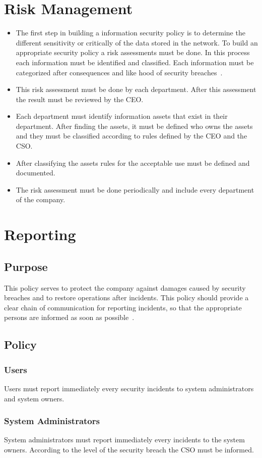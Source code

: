 \chapter{Risk Management}
\begin{itemize}
\item The first step in building a information security policy is to determine the different sensitivity or critically of the data stored in the network. To build an appropriate security policy a risk assessments must be done. In this process each information must be identified and classified.  Each information must be categorized after consequences and like hood of security breaches~\cite{Host}. 
\item This risk assessment must be done by each department.  After this assessment the result must be reviewed by the CEO. 
\item Each department must identify information assets that exist in their department.  After finding the assets, it must be defined who owns the assets and they must be classified according to rules defined by the CEO and the CSO.
\item After classifying the assets rules for  the acceptable use must be defined and documented. 
\item The risk assessment must be done periodically and include every department of the company. 
\end{itemize}
\chapter{Reporting}
\section{Purpose}
This policy serves to protect the company against damages caused  by security breaches and to restore operations after incidents. This policy should provide a clear chain of communication for reporting incidents, so that the appropriate persons are informed as soon as possible~\cite{Ox}. 
\section{Policy}
\subsection{Users} 
Users must report immediately every security incidents to system administrators and system owners. 
\subsection{System Administrators}
System administrators must report immediately every incidents to the system owners. According to the level of the security breach the CSO must be informed.

